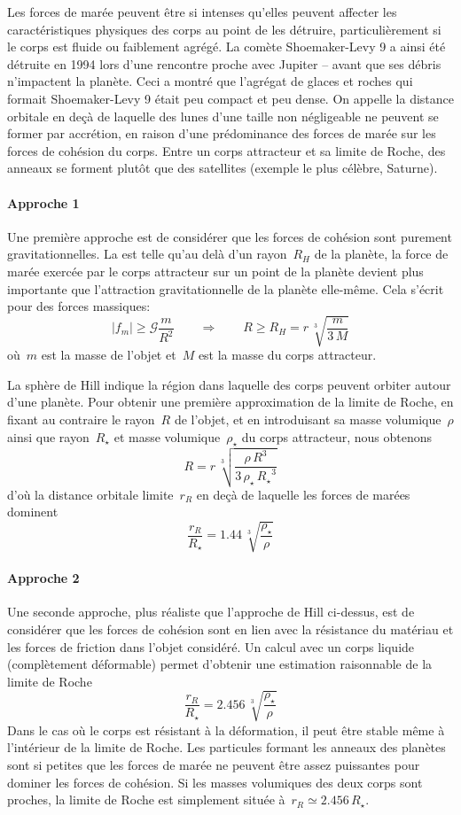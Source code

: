 \sk
Les forces de marée peuvent être si intenses qu'elles peuvent affecter les caractéristiques physiques des corps au point de les détruire, particulièrement si le corps est fluide ou faiblement agrégé. La comète Shoemaker-Levy 9 a ainsi été détruite en 1994 lors d'une rencontre proche avec Jupiter -- avant que ses débris n'impactent la planète. Ceci a montré que l'agrégat de glaces et roches qui formait Shoemaker-Levy 9 était peu compact et peu dense. On appelle  la distance orbitale en deçà de laquelle des lunes d'une taille non négligeable ne peuvent se former par accrétion, en raison d'une prédominance des forces de marée sur les forces de cohésion du corps. Entre un corps attracteur et sa limite de Roche, des anneaux se forment plutôt que des satellites (exemple le plus célèbre, Saturne).

\sk
\paragraph{Approche 1} Une première approche est de considérer que les forces de cohésion sont purement gravitationnelles. La  est telle qu'au delà d'un rayon~$R_H$ de la planète, la force de marée exercée par le corps attracteur sur un point de la planète devient plus importante que l'attraction gravitationnelle de la planète elle-même. Cela s'écrit pour des forces massiques:
\[ |f_m| \geq \mathcal{G} \frac{m}{R^2} \qquad \Rightarrow \qquad R \geq R_H = r \, \sqrt[3]{ \frac{m}{3\,M} } \]
\noindent où~$m$ est la masse de l'objet et~$M$ est la masse du corps attracteur.

\sk
La sphère de Hill indique la région dans laquelle des corps peuvent orbiter autour d'une planète. Pour obtenir une première approximation de la limite de Roche, en fixant au contraire le rayon~$R$ de l'objet, et en introduisant sa masse volumique~$\rho$ ainsi que rayon~$R_{\star}$ et masse volumique~$\rho_{\star}$ du corps attracteur, nous obtenons
\[ R = r \, \sqrt[3]{ \frac{\rho \, R^3}{3\, \rho_{\star} \, {R_{\star}}^3} } \]
d'où la distance orbitale limite~$r_R$ en deçà de laquelle les forces de marées dominent
\[ \frac{r_R}{R_{\star}} = 1.44 \, \sqrt[3]{ \frac{\rho_{\star}}{\rho} } \]

\sk
\paragraph{Approche 2} Une seconde approche, plus réaliste que l'approche de Hill ci-dessus, est de considérer que les forces de cohésion sont en lien avec la résistance du matériau et les forces de friction dans l'objet considéré. Un calcul avec un corps liquide (complètement déformable) permet d'obtenir une estimation raisonnable de la limite de Roche
\[ \frac{r_R}{R_{\star}} = 2.456 \, \sqrt[3]{ \frac{\rho_{\star}}{\rho} } \]
\noindent Dans le cas où le corps est résistant à la déformation, il peut être stable même à l'intérieur de la limite de Roche. Les particules formant les anneaux des planètes sont si petites que les forces de marée ne peuvent être assez puissantes pour dominer les forces de cohésion. Si les masses volumiques des deux corps sont proches, la limite de Roche est simplement située à~$r_R \simeq 2.456 \, R_{\star}$.

